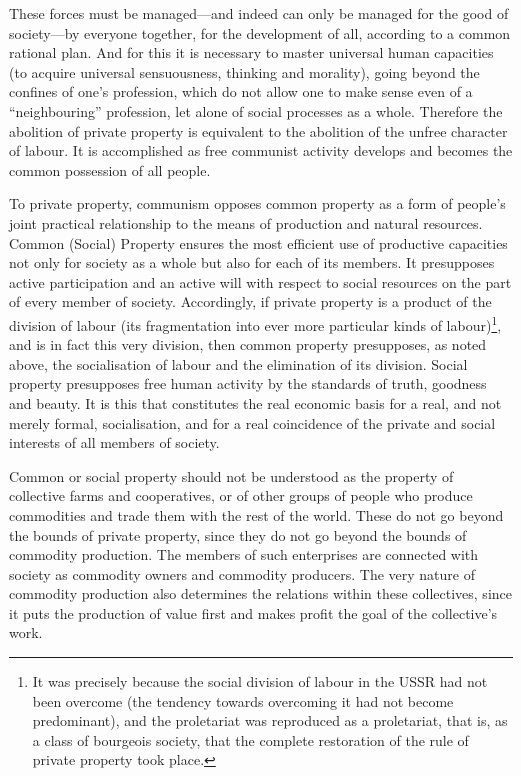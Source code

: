 \documentclass[12pt,a4paper,openany]{book}
\begin{document}
These forces must be managed—and indeed can only be managed for the good of society—by everyone together, for the development of all, according to a common rational plan. And for this it is necessary to master universal human capacities (to acquire universal sensuousness, thinking and morality), going beyond the confines of one's profession, which do not allow one to make sense even of a “neighbouring” profession, let alone of social processes as a whole. Therefore the abolition of private property is equivalent to the abolition of the unfree character of labour. It is accomplished as free communist activity develops and becomes the common possession of all people.

To private property, communism opposes common property as a form of people's joint practical relationship to the means of production and natural resources. Common (Social) Property ensures the most efficient use of productive capacities not only for society as a whole but also for each of its members. It presupposes active participation and an active will with respect to social resources on the part of every member of society. Accordingly, if private property is a product of the division of labour (its fragmentation into ever more particular kinds of labour)\footnote{It was precisely because the social division of labour in the USSR had not been overcome (the tendency towards overcoming it had not become predominant), and the proletariat was reproduced as a proletariat, that is, as a class of bourgeois society, that the complete restoration of the rule of private property took place.}, and is in fact this very division, then common property presupposes, as noted above, the socialisation of labour and the elimination of its division. Social property presupposes free human activity by the standards of truth, goodness and beauty. It is this that constitutes the real economic basis for a real, and not merely formal, socialisation, and for a real coincidence of the private and social interests of all members of society.

Common or social property should not be understood as the property of collective farms and cooperatives, or of other groups of people who produce commodities and trade them with the rest of the world. These do not go beyond the bounds of private property, since they do not go beyond the bounds of commodity production. The members of such enterprises are connected with society as commodity owners and commodity producers. The very nature of commodity production also determines the relations within these collectives, since it puts the production of value first and makes profit the goal of the collective's work.
\end{document}
